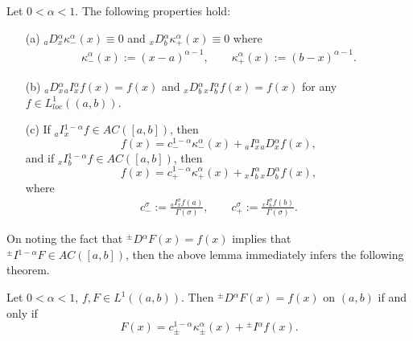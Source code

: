 \documentclass[leqno,final]{siamltex}
\numberwithin{equation}{section}
\renewcommand{\(}{\bigl(}
\renewcommand{\)}{\bigr)}
\begin{document}
    \begin{lemma} \label{lemma3.1}
        Let $0 < \alpha <1$. The  following properties hold:
        \begin{itemize}
        \item[(a)]  ${_{a}}{D}{^{\alpha}_{x}} \kappa^{\alpha}_{-}(x) \equiv 0$ and ${_{x}}{D}{^{\alpha}_{b}} \kappa^{\alpha}_{+}(x) \equiv 0$ where
        \begin{align}\label{kernel_functions}
            \kappa^{\alpha}_{-}(x) := (x-a)^{\alpha -1}, \qquad \kappa^{\alpha}_{+}(x) := (b-x)^{\alpha-1} .
        \end{align}
            \item[(b)] ${_{a}}{D}{^{\alpha}_{x}}{_{a}}{I}{^{\alpha}_{x}} f(x) = f(x)$ and ${_{x}}{D}{^{\alpha}_{b}}{_{x}}{I}{^{\alpha}_{b}}f(x) = f(x)$ for any $f \in L^{1}_{loc}((a,b))$.
            \item[(c)] If ${_{a}}{I}{^{1 - \alpha}_{x}}f \in AC([a,b])$, then 
            \begin{equation}\label{FTFC_1}
            f(x) = c^{1-\alpha}_{-} \kappa^{\alpha}_{-}(x) + {_{a}}{I}{^{\alpha}_{x}}{_{a}}{D}{^{\alpha}_{x}}f(x),
            \end{equation} 
            and if ${_{x}}{I}{^{1 - \alpha}_{b}}f \in AC([a,b])$, then 
            \begin{equation}\label{FTFC_2}
            f(x) = c^{1-\alpha}_{+} \kappa^{\alpha}_{+}(x) + {_{x}}{I}{^{\alpha}_{b}} {_{x}}{D}{^{\alpha}_{b}}f(x),
            \end{equation}
            where 
           \begin{align} \label{FTFC_3}
            c_{-}^{\sigma}  := \frac{  {_{a}}{I}{^{\sigma}_{x}} f(a) }{\Gamma(\sigma)},\qquad
            c_{+}^{\sigma} := \frac{   {_{x}}{I}{^{\sigma}_{b}} f(b) }{\Gamma(\sigma)}. 
            \end{align}
        \end{itemize}
    
    \end{lemma}

On noting the fact that ${^{\pm}}{D}{^{\alpha}}F(x) = f(x)$ implies that ${^{\pm}}{I}{^{1-\alpha}}F \in AC([a,b])$, then the above lemma immediately infers the 
following theorem. 

    \begin{theorem} \label{FTFC} 
        Let $0<\alpha <1$, $f, F \in L^{1}((a,b))$. %
        Then ${^{\pm}}{D}{^{\alpha}}F(x) = f(x)$  on $(a,b)$ if and only if 
        \begin{equation}\label{FTFC_4} 
        F(x) = c_{\pm}^{1-\alpha} \kappa^{\alpha}_{\pm}(x) + {^{\pm}}{I}{^{\alpha}}f(x).
        \end{equation}
  
    \end{theorem} 
\end{document}
